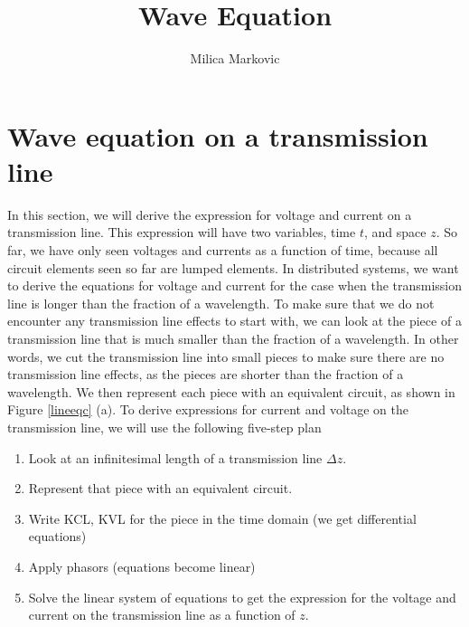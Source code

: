 \documentclass{ximera}
\title{Wave Equation}
\author{Milica Markovic}
\begin{document}
  
\begin{abstract}  

\end{abstract}  
\maketitle    




\section{ Wave equation on a transmission line}\label{telegrapher}

In this section, we will derive the expression for voltage and current
on a transmission line. This expression will have two variables, time $t$, and space $z$. 
So far, we have only seen voltages and currents as a function of time, because all circuit elements seen so far are lumped elements. In distributed systems,
we want to derive the equations for voltage and current for the case when the transmission
line is longer than the fraction of a wavelength.  To make sure that we
do not encounter any transmission line effects to start with, we can
look at the piece of a transmission line that is much smaller than
the fraction of a wavelength. In other words, we cut the transmission
line into small pieces to make sure there are no transmission line
effects, as the pieces are shorter than the fraction of a wavelength. We then represent each piece with
an equivalent circuit, as shown in Figure \ref{lineeqc} (a). 
To derive expressions for current and voltage on the transmission line, we will use the following five-step plan

\begin{enumerate}
\item Look at an infinitesimal length of a transmission line $\Delta z$.  

\item Represent that piece with an equivalent circuit. 

\item Write KCL, KVL for the piece in the time domain (we get
differential equations)

\item Apply phasors (equations become linear)

\item Solve the linear system of equations to get the expression for
the voltage and current on the transmission line as a function of $z$.

\end{enumerate}
\end{document}
